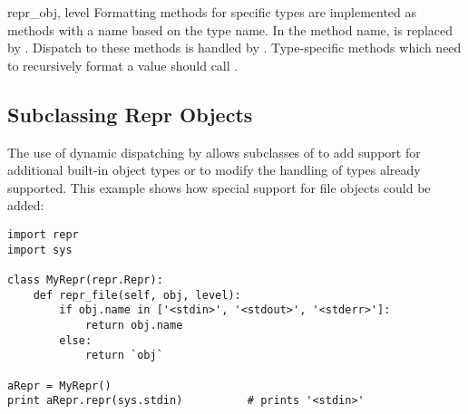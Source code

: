 \begin{methoddescni}[Repr]{repr_}{obj, level}
  Formatting methods for specific types are implemented as methods
  with a name based on the type name.  In the method name, 
  is replaced by
  .
  Dispatch to these methods is handled by .
  Type-specific methods which need to recursively format a value
  should call .
\end{methoddescni}


\subsection{Subclassing Repr Objects \label{subclassing-reprs}}

The use of dynamic dispatching by  allows
subclasses of  to add support for additional built-in
object types or to modify the handling of types already supported.
This example shows how special support for file objects could be
added:

\begin{verbatim}
import repr
import sys

class MyRepr(repr.Repr):
    def repr_file(self, obj, level):
        if obj.name in ['<stdin>', '<stdout>', '<stderr>']:
            return obj.name
        else:
            return `obj`

aRepr = MyRepr()
print aRepr.repr(sys.stdin)          # prints '<stdin>'
\end{verbatim}
